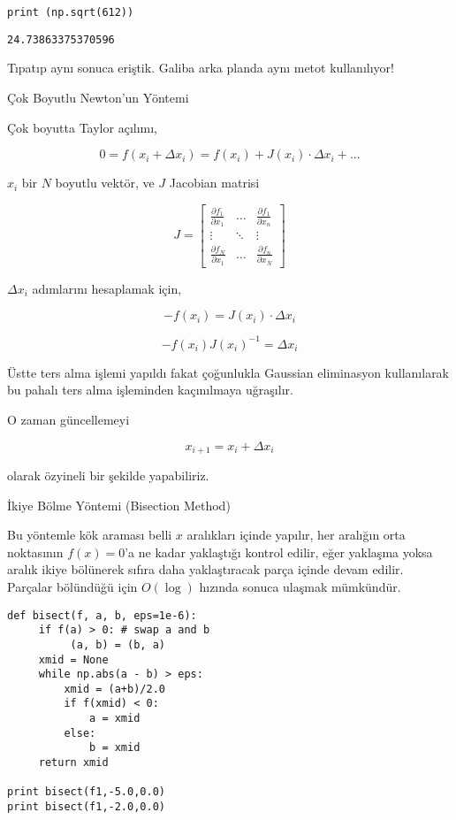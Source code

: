 \documentclass[12pt,fleqn]{article}\usepackage{../../common}
\begin{document}
\begin{verbatim}
print (np.sqrt(612))
\end{verbatim}

\begin{verbatim}
24.73863375370596
\end{verbatim}

Tıpatıp aynı sonuca eriştik. Galiba arka planda aynı metot kullanılıyor!

Çok Boyutlu Newton'un Yöntemi

Çok boyutta Taylor açılımı,

$$ 
0 = f(x_i + \Delta x_i) = f(x_i) + J(x_i) \cdot \Delta x_i + ... 
$$

$x_i$ bir $N$ boyutlu vektör, ve $J$ Jacobian matrisi

$$ 
J = \left[\begin{array}{rrr}
\frac{\partial f_1}{\partial x_1}  & \dots & \frac{\partial f_1}{\partial x_n} \\
 \vdots & \ddots & \vdots \\
\frac{\partial f_N}{\partial x_1}  & \dots & \frac{\partial f_n}{\partial x_N} 
\end{array}\right]
$$

$\Delta x_i$ adımlarını hesaplamak için,

$$  -f(x_i) =  J(x_i) \cdot \Delta x_i  $$

$$  -f(x_i)J(x_i)^{-1} = \Delta x_i  $$

Üstte ters alma işlemi yapıldı fakat çoğunlukla Gaussian eliminasyon
kullanılarak bu pahalı ters alma işleminden kaçınılmaya uğraşılır.

O zaman güncellemeyi

$$ x_{i+1} = x_i + \Delta x_i $$

olarak özyineli bir şekilde yapabiliriz.

İkiye Bölme Yöntemi (Bisection Method)

Bu yöntemle kök araması belli $x$ aralıkları içinde yapılır, her aralığın
orta noktasının $f(x)=0$'a ne kadar yaklaştığı kontrol edilir, eğer
yaklaşma yoksa aralık ikiye bölünerek sıfıra daha yaklaştıracak parça
içinde devam edilir. Parçalar bölündüğü için $O(\log)$ hızında sonuca
ulaşmak mümkündür.

\begin{verbatim}
def bisect(f, a, b, eps=1e-6):
     if f(a) > 0: # swap a and b
          (a, b) = (b, a)
     xmid = None
     while np.abs(a - b) > eps:
         xmid = (a+b)/2.0
         if f(xmid) < 0:
             a = xmid
         else:
             b = xmid
     return xmid

print bisect(f1,-5.0,0.0) 
print bisect(f1,-2.0,0.0) 
\end{verbatim}
\end{document}
